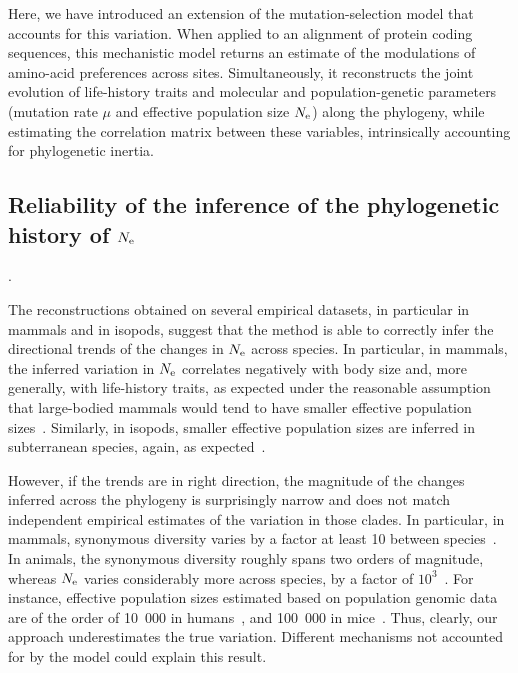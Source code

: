 \documentclass{MBE}
\begin{document}
	Here, we have introduced an extension of the mutation-selection model that accounts for this variation.
	When applied to an alignment of protein coding sequences, this mechanistic model returns an estimate of the modulations of amino-acid preferences across sites.
	Simultaneously, it reconstructs the joint evolution of life-history traits and molecular and population-genetic parameters (mutation rate $\mu$ and {effective population size} $N_{\text{e}}$) along the phylogeny, while estimating the correlation matrix between these variables, intrinsically accounting for phylogenetic inertia.

	\subsection{Reliability of the inference of the phylogenetic history of $N_{\text{e}}$}.

	The reconstructions obtained on several empirical datasets, in particular in mammals and in isopods, suggest that the method is able to correctly infer the directional trends of the changes in $N_{\text{e}}$ across species.
	In particular, in mammals, the inferred variation in $N_{\text{e}}$ correlates negatively with body size and, more generally, with life-history traits, as expected under the reasonable assumption that large-bodied mammals would tend to have smaller effective population sizes~\cite{Popadin2007,Lartillot2012,Nabholz2013,Figuet2017}.
	Similarly, in isopods, smaller effective population sizes are inferred in subterranean species, again, as expected~\citep{Capderrey2013}.

	However, if the trends are in right direction, the magnitude of the changes inferred across the phylogeny is surprisingly narrow and does not match independent empirical estimates of the variation in those clades.
	In particular, in mammals, {synonymous} diversity varies by a factor at least 10 between species~\citep{Galtier2016}.
	In animals, the {synonymous} diversity roughly spans two orders of magnitude, whereas $N_{\text{e}}$ varies considerably more across species, by a factor of $10^3$~\citep{Galtier2019}.
	For instance, effective population sizes estimated based on population genomic data are of the order of 10~000 in humans~\citep{Li2011}, and 100~000 in mice~\citep{Geraldes2008}.
	Thus, clearly, our approach underestimates the true variation.
	Different mechanisms not accounted for by the model could explain this result.
\end{document}
